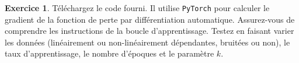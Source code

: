 \documentclass[a4paper,francais]{article}
\theoremstyle{definition}
\newtheorem{exercice}{Exercice}[section]
\begin{document}
\begin{exercice}
  Téléchargez le code fourni. Il utilise \verb!PyTorch! pour calculer le
  gradient de la fonction de perte par différentiation automatique. Assurez-vous
  de comprendre les instructions de la boucle d'apprentissage. Testez en faisant
  varier les données (linéairement ou non-linéairement dépendantes, bruitées ou non),
  le taux d'apprentissage, le nombre d'époques et le paramètre $k$.  
\end{exercice}
\end{document}
